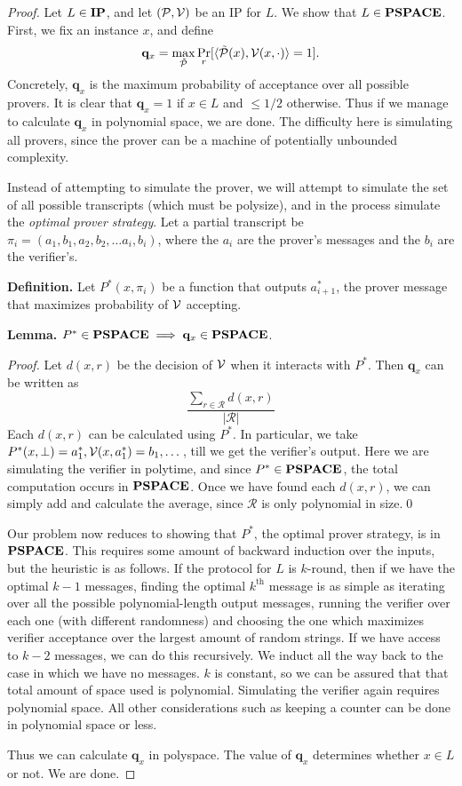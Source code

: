 \begin{proof}
	Let $L\in\mathbf{IP}$, and let $(\mathcal{P},\mathcal{V})$ be an IP for $L$. We show that $L\in\mathbf{PSPACE}$. First, we fix an instance $x$, and define
	$$\mathbf{q}_x=\max_{\tilde{\mathcal{P}}}\Pr_{r}[\langle\tilde{\mathcal{P}}(x), \mathcal{V}(x, \cdot)\rangle=1].$$
	Concretely, $\mathbf{q}_x$ is the maximum probability of acceptance over all possible provers. It is clear that $\mathbf{q}_x=1$ if $x\in L$ and $\leq 1/2$ otherwise. Thus if we manage to calculate $\mathbf{q}_x$ in polynomial space, we are done. The difficulty here is simulating all provers, since the prover can be a machine of potentially unbounded complexity.
	
	Instead of attempting to simulate the prover, we will attempt to simulate the set of all possible transcripts (which must be polysize), and in the process simulate the \textit{optimal prover strategy}. Let a partial transcript be $\pi_i=(a_1,b_1, a_2,b_2,\dots a_i,b_i)$, where the $a_i$ are the prover's messages and the $b_i$ are the verifier's.
	
	\textbf{Definition.} Let $P^{*}(x, \pi_i)$ be a function that outputs $a_{i+1}^{*}$, the prover message that maximizes probability of $\mathcal{V}$ accepting.
	
	\textbf{Lemma.} $P^{*}\in\mathbf{PSPACE}\implies\mathbf{q}_x\in\mathbf{PSPACE}$.
	
	\textit{Proof.} Let $d(x,r)$ be the decision of $\mathcal{V}$ when it interacts with $P^{*}$. Then $\mathbf{q}_x$ can be written as
	$$\frac{\sum_{r\in\mathcal{R}}d(x,r)}{|\mathcal{R}|}$$
	Each $d(x,r)$ can be calculated using $P^{*}$. In particular, we take $P^{*}(x,\bot)=a_{1}^{*}, \mathcal{V}(x, a_1^{*})=b_1,\dots$, till we get the verifier's output. Here we are simulating the verifier in polytime, and since $P^{*}\in\mathbf{PSPACE}$, the total computation occurs in $\mathbf{PSPACE}$. Once we have found each $d(x,r)$, we can simply add and calculate the average, since $\mathcal{R}$ is only polynomial in size.\qed
	
	Our problem now reduces to showing that $P^{*}$, the optimal prover strategy, is in $\mathbf{PSPACE}$. This requires some amount of backward induction over the inputs, but the heuristic is as follows. If the protocol for $L$ is $k$-round, then if we have the optimal $k-1$ messages, finding the optimal $k^{\text{th}}$ message is as simple as iterating over all the possible polynomial-length output messages, running the verifier over each one (with different randomness) and choosing the one which maximizes verifier acceptance over the largest amount of random strings. If we have access to $k-2$ messages, we can do this recursively. We induct all the way back to the case in which we have no messages. $k$ is constant, so we can be assured that that total amount of space used is polynomial. Simulating the verifier again requires polynomial space. All other considerations such as keeping a counter can be done in polynomial space or less. 
	
	Thus we can calculate $\mathbf{q}_x$ in polyspace. The value of $\mathbf{q}_x$ determines whether $x\in L$ or not. We are done.
\end{proof}
